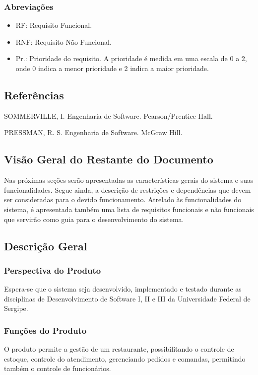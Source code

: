 	\subsubsection{Abreviações}
	\begin{itemize}
	\item[] RF: Requisito Funcional.
	\item[] RNF: Requisito Não Funcional.
	\item[] Pr.: Prioridade do requisito. A prioridade é medida em uma escala de 0 a 2, onde 0 indica a menor prioridade e 2 indica a maior prioridade.
	\end{itemize}



\subsection{Referências}
SOMMERVILLE, I. Engenharia de Software. Pearson/Prentice Hall.

PRESSMAN, R. S. Engenharia de Software. McGraw Hill.



\subsection{Visão Geral do Restante do Documento}
Nas próximas seções serão apresentadas as características gerais do sistema e suas funcionalidades. Segue ainda, a descrição de restrições e dependências que devem ser consideradas para o devido funcionamento. Atrelado às funcionalidades do sistema, é apresentada também uma lista de requisitos funcionais e não funcionais que servirão como guia para o desenvolvimento do sistema.



\subsection{Descrição Geral}

	\subsubsection{Perspectiva do Produto}
	Espera-se que o sistema seja desenvolvido, implementado e testado durante as disciplinas de Desenvolvimento de Software I, II e III da Universidade Federal de Sergipe.
	
	\subsubsection{Funções do Produto}
	O produto permite a gestão de um restaurante, possibilitando o controle de estoque, controle do atendimento, gerenciando pedidos e comandas, permitindo também o controle de funcionários.
	

